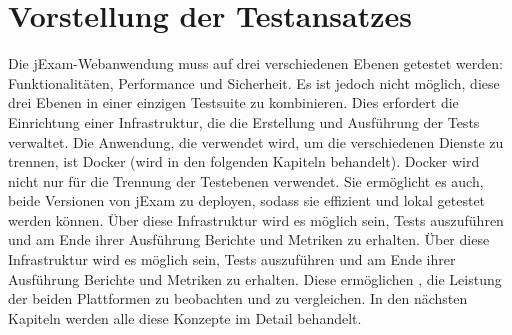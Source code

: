 \section{Vorstellung der Testansatzes}

Die jExam-Webanwendung muss auf drei verschiedenen Ebenen getestet
werden: Funktionalitäten, Performance und Sicherheit. Es ist jedoch
nicht möglich, diese drei Ebenen in einer einzigen Testsuite zu
kombinieren. Dies erfordert die Einrichtung einer Infrastruktur,
die die Erstellung und Ausführung der Tests verwaltet. Die Anwendung,
die verwendet wird, um die verschiedenen Dienste zu trennen, ist Docker \cite{docker}
(wird in den folgenden Kapiteln behandelt). Docker  wird nicht nur für
die Trennung der Testebenen verwendet. Sie ermöglicht es auch, beide
Versionen von jExam zu deployen, sodass sie effizient und lokal
getestet werden können. \"Uber diese Infrastruktur wird es möglich
sein, Tests auszuführen und am Ende ihrer Ausführung Berichte und
Metriken zu erhalten. \"Uber diese Infrastruktur wird es möglich sein,
Tests auszuführen und am Ende ihrer Ausführung Berichte und Metriken
zu erhalten. Diese ermöglichen , die Leistung der beiden Plattformen
zu beobachten und zu vergleichen. In den nächsten Kapiteln werden
alle diese Konzepte im Detail behandelt.

